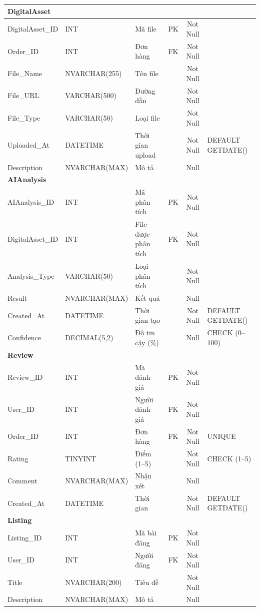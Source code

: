 \documentclass[12pt,a4paper]{article}
\begin{document}
\begin{longtable}{|l|l|p{4.2cm}|c|c|p{3.5cm}|}
\hline
\multicolumn{6}{|l|}{\textbf{DigitalAsset}} \\
\hline
DigitalAsset\_ID & INT & Mã file & PK & Not Null & \\
Order\_ID & INT & Đơn hàng & FK & Not Null & \\
File\_Name & NVARCHAR(255) & Tên file & & Not Null & \\
File\_URL & VARCHAR(500) & Đường dẫn & & Not Null & \\
File\_Type & VARCHAR(50) & Loại file & & Not Null & \\
Uploaded\_At & DATETIME & Thời gian upload & & Not Null & DEFAULT GETDATE() \\
Description & NVARCHAR(MAX) & Mô tả & & Null & \\
\hline
\multicolumn{6}{|l|}{\textbf{AIAnalysis}} \\
\hline
AIAnalysis\_ID & INT & Mã phân tích & PK & Not Null & \\
DigitalAsset\_ID & INT & File được phân tích & FK & Not Null & \\
Analysis\_Type & VARCHAR(50) & Loại phân tích & & Not Null & \\
Result & NVARCHAR(MAX) & Kết quả & & Null & \\
Created\_At & DATETIME & Thời gian tạo & & Not Null & DEFAULT GETDATE() \\
Confidence & DECIMAL(5,2) & Độ tin cậy (\%) & & Null & CHECK (0--100) \\
\hline
\multicolumn{6}{|l|}{\textbf{Review}} \\
\hline
Review\_ID & INT & Mã đánh giá & PK & Not Null & \\
User\_ID & INT & Người đánh giá & FK & Not Null & \\
Order\_ID & INT & Đơn hàng & FK & Not Null & UNIQUE \\
Rating & TINYINT & Điểm (1--5) & & Not Null & CHECK (1--5) \\
Comment & NVARCHAR(MAX) & Nhận xét & & Null & \\
Created\_At & DATETIME & Thời gian & & Not Null & DEFAULT GETDATE() \\
\hline
\multicolumn{6}{|l|}{\textbf{Listing}} \\
\hline
Listing\_ID & INT & Mã bài đăng & PK & Not Null & \\
User\_ID & INT & Người đăng & FK & Not Null & \\
Title & NVARCHAR(200) & Tiêu đề & & Not Null & \\
Description & NVARCHAR(MAX) & Mô tả & & Null & \\

\end{longtable}
\end{document}

